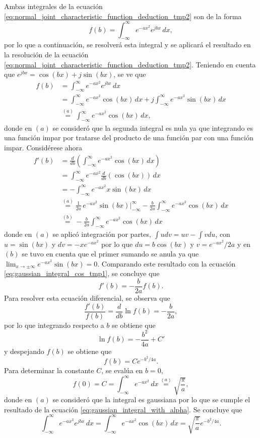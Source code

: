 \documentclass[a4paper]{report}
\begin{document}
Ambas integrales de la ecuación \ref{eq:normal_joint_characteristic_function_deduction_tmp2} son de la forma
\[
 f(b)=\int_{-\infty}^{\infty}e^{-ax^2}e^{jbx}\,dx,
\]
por lo que a continuación, se resolverá esta integral y se aplicará el resultado en la resolución de la ecuación \ref{eq:normal_joint_characteristic_function_deduction_tmp2}.
Teniendo en cuenta que \(e^{jbx}=\cos(bx)+j\sin(bx)\), se ve que
\begin{align}\label{eq:gaussian_integral_cos_tmp1}
 f(b)&=\int_{-\infty}^{\infty}e^{-ax^2}e^{jbx}\,dx\nonumber\\
   &=\int_{-\infty}^{\infty}e^{-ax^2}\cos(bx)\,dx+j\int_{-\infty}^{\infty}e^{-ax^2}\sin(bx)\,dx\nonumber\\
   &\overset{(a)}{=}\int_{-\infty}^{\infty}e^{-ax^2}\cos(bx)\,dx,
\end{align}
donde en \((a)\) se consideró que la segunda integral es nula ya que integrando es una función impar por tratarse del producto de una función par con una función impar. Considérese ahora
\begin{align*}
 f'(b)&=\frac{d}{db}\left(\int_{-\infty}^{\infty}e^{-ax^2}\cos(bx)\,dx\right)\\
   &=\int_{-\infty}^{\infty}e^{-ax^2}\frac{d}{db}\left(\cos(bx)\right)\,dx\\
   &=-\int_{-\infty}^{\infty}e^{-ax^2}x\sin(bx)\,dx\\
   &\overset{(a)}{=}\frac{1}{2a}\,e^{-ax^2}\sin(bx)\bigg|_{-\infty}^{\infty}-\frac{b}{2a}\int_{-\infty}^{\infty}e^{-ax^2}\cos(bx)\,dx\\
   &\overset{(b)}{=}-\frac{b}{2a}\int_{-\infty}^{\infty}e^{-ax^2}\cos(bx)\,dx
\end{align*}
donde en \((a)\) se aplicó integración por partes, \(\int udv=uv-\int vdu\), con \(u=\sin(bx)\) y \(dv=-xe^{-ax^2}\) por lo que \(du=b\cos(bx)\) y \(v=e^{-ax^2}/2a\) y en \((b)\) se tuvo en cuenta que el primer sumando se anula ya que \(\lim_{x\to\pm\infty}e^{-ax^2}\sin(bx)=0\). Comparando este resultado con la ecuación \ref{eq:gaussian_integral_cos_tmp1}, se concluye que
\[
 f'(b)=-\frac{b}{2a}f(b).
\]
Para resolver esta ecuación diferencial, se observa que
\[
 \frac{f'(b)}{f(b)}=\frac{d}{db}\ln f(b)=-\frac{b}{2a},
\]
por lo que integrando respecto a \(b\) se obtiene que
\[
 \ln f(b)=-\frac{b^2}{4a}+C'
\]
y despejando \(f(b)\) se obtiene que
\[
 f(b)=Ce^{-b^2/4a}.
\]
Para determinar la constante \(C\), se evalúa en \(b=0\),
\[
 f(0)=C=\int_{-\infty}^{\infty}e^{-ax^2}\,dx\overset{(a)}{=}\sqrt{\frac{\pi}{a}},
\]
donde en \((a)\) se consideró que la integral es gaussiana por lo que se cumple el resultado de la ecuación \ref{eq:gaussian_integral_with_alpha}. Se concluye que
\begin{equation}\label{eq:gaussian_integral_with_cos}
 \int_{-\infty}^{\infty}e^{-ax^2}e^{jbx}\,dx=\int_{-\infty}^{\infty}e^{-ax^2}\cos(bx)\,dx=\sqrt{\frac{\pi}{a}}e^{-b^2/4a}.
\end{equation}
\end{document}
